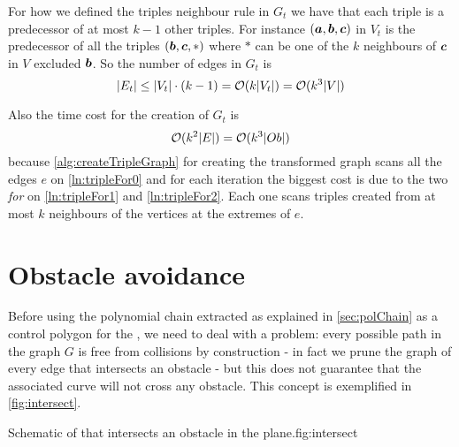 \documentclass[dissertation.tex]{subfiles}
\begin{document}
For how we defined the triples neighbour rule in $G_t$ we have
that each triple is a predecessor of at most $k-1$ other triples. For
instance $(\boldsymbol{a},\boldsymbol{b},\boldsymbol{c})$ in $V_t$ is the predecessor of all the triples
$(\boldsymbol{b},\boldsymbol{c},*)$ where $*$ can be one of the $k$ neighbours
of $\boldsymbol{c}$ in $V$ excluded $\boldsymbol{b}$. So the number of edges in $G_t$ is
\begin{equation}
  \label{eq:numEdgesTriples}
  |E_t|\leq |V_t|\cdot (k-1)=\mathcal{O}(k|V_t|)=\mathcal{O}(k^3|V|)
\end{equation}

Also the time cost for the creation of $G_t$ is
\newcommand{\eqCostVt}{\ensuremath{\bigO(k^3|Ob|)}}
\begin{equation}
  \label{eq:costVt}
  \bigO(k^2|E|)=\eqCostVt
\end{equation}
because \cref{alg:createTripleGraph} for creating the transformed
graph scans all the edges $e$ on \cref{ln:tripleFor0} and for each
iteration
the biggest cost is due to the two \emph{for} on \cref{ln:tripleFor1} and
\cref{ln:tripleFor2}. Each one scans triples created from at most
$k$ neighbours
of the vertices at the extremes of $e$.

\section{Obstacle avoidance}\label{sec:obsAvoid}
Before using the polynomial chain extracted as
explained in \cref{sec:polChain} as a control polygon for the
\bs, we need to deal with a
problem: every possible path in the graph $G$ is
free from collisions by construction - in fact we prune the graph of
every edge that intersects an obstacle - but this does not guarantee
that the associated curve will not cross any obstacle. This concept is
exemplified in
\cref{fig:intersect}.
\begin{myfig}{Schematic of \bs that intersects an obstacle in the plane.}{fig:intersect}
\end{myfig}
\end{document}
